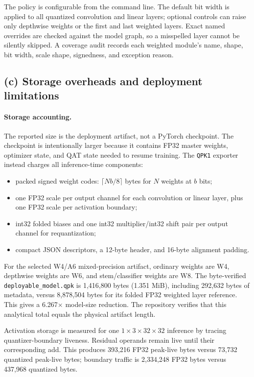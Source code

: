 The policy is configurable from the command line. The default bit width is
applied to all quantized convolution and linear layers; optional controls can
raise only depthwise weights or the first and last weighted layers. Exact named
overrides are checked against the model graph, so a misspelled layer cannot be
silently skipped. A coverage audit records each weighted module's name, shape,
bit width, scale shape, signedness, and exception reason.

\subsection{(c) Storage overheads and deployment limitations}

\paragraph{Storage accounting.} The reported size is the deployment artifact,
not a PyTorch checkpoint. The checkpoint is intentionally larger because it
contains FP32 master weights, optimizer state, and QAT state needed to resume
training. The \texttt{QPK1} exporter instead charges all inference-time
components:

\begin{itemize}
    \item packed signed weight codes: $\lceil Nb/8\rceil$ bytes for $N$
    weights at $b$ bits;
    \item one FP32 scale per output channel for each convolution or linear
    layer, plus one FP32 scale per activation boundary;
    \item int32 folded biases and one int32 multiplier/int32 shift pair per
    output channel for requantization;
    \item compact JSON descriptors, a 12-byte header, and 16-byte alignment
    padding.
\end{itemize}

For the selected W4/A6 mixed-precision artifact, ordinary weights are W4,
depthwise weights are W6, and stem/classifier weights are W8. The byte-verified
\texttt{deployable\_model.qpk} is 1,416,800 bytes (1.351 MiB), including
292,632 bytes of metadata, versus 8,878,504 bytes for its folded FP32 weighted
layer reference. This gives a 6.267$\times$ model-size reduction. The
repository verifies that this analytical total equals the physical artifact
length.

Activation storage is measured for one $1\times3\times32\times32$ inference
by tracing quantizer-boundary liveness. Residual operands remain live until
their corresponding add. This produces 393,216 FP32 peak-live bytes versus
73,732 quantized peak-live bytes; boundary traffic is 2,334,248 FP32 bytes
versus 437,968 quantized bytes.

